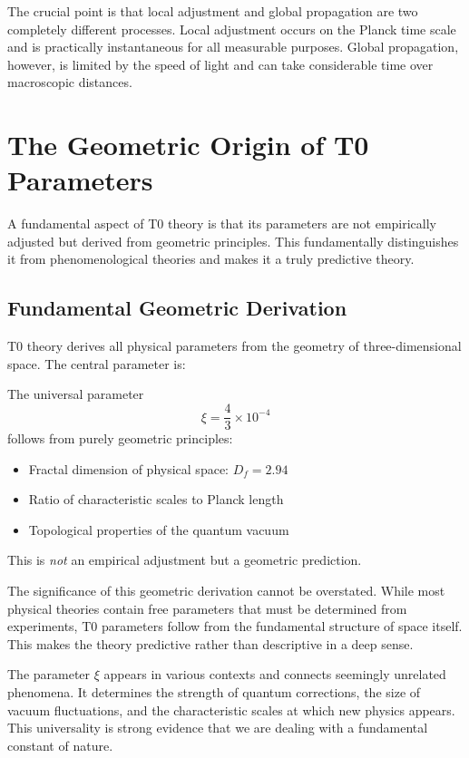 	The crucial point is that local adjustment and global propagation are two completely different processes. Local adjustment occurs on the Planck time scale and is practically instantaneous for all measurable purposes. Global propagation, however, is limited by the speed of light and can take considerable time over macroscopic distances.
	
	\section{The Geometric Origin of T0 Parameters}
	
	A fundamental aspect of T0 theory is that its parameters are not empirically adjusted but derived from geometric principles. This fundamentally distinguishes it from phenomenological theories and makes it a truly predictive theory.
	
	\subsection{Fundamental Geometric Derivation}
	
	T0 theory derives all physical parameters from the geometry of three-dimensional space. The central parameter is:
	
	\begin{tcolorbox}[colback=t0blue!5!white, colframe=t0blue!75!black, title=T0 Prediction]
		The universal parameter
		\begin{equation}
			\xi = \frac{4}{3} \times 10^{-4}
		\end{equation}
		follows from purely geometric principles:
		\begin{itemize}
			\item Fractal dimension of physical space: $D_f = 2.94$
			\item Ratio of characteristic scales to Planck length
			\item Topological properties of the quantum vacuum
		\end{itemize}
		This is \emph{not} an empirical adjustment but a geometric prediction.
	\end{tcolorbox}
	
	The significance of this geometric derivation cannot be overstated. While most physical theories contain free parameters that must be determined from experiments, T0 parameters follow from the fundamental structure of space itself. This makes the theory predictive rather than descriptive in a deep sense.
	
	The parameter $\xi$ appears in various contexts and connects seemingly unrelated phenomena. It determines the strength of quantum corrections, the size of vacuum fluctuations, and the characteristic scales at which new physics appears. This universality is strong evidence that we are dealing with a fundamental constant of nature.
	
